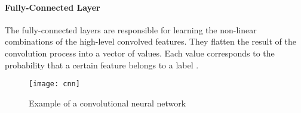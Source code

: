 \paragraph{Fully-Connected Layer}
The fully-connected layers are responsible for learning the non-linear combinations of the high-level convolved features.
They flatten the result of the convolution process into a vector of values.
Each value corresponds to the probability that a certain feature belongs to a label \cite{cnn_tds}.

\begin{figure}[t]
  \centering
  \texttt{[image: cnn]}
  \caption{Example of a convolutional neural network \cite{cnn_tds}}
  \label{fig:cnn}
\end{figure}
